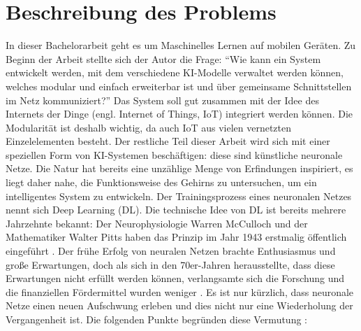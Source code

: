 \section{Beschreibung des Problems}
In dieser Bachelorarbeit geht es um Maschinelles Lernen auf mobilen Geräten.
Zu Beginn der Arbeit stellte sich der Autor die Frage:
\enquote{Wie kann ein System entwickelt werden, mit dem verschiedene KI-Modelle
  verwaltet werden können, welches modular und einfach erweiterbar ist
  und über gemeinsame Schnittstellen im Netz kommuniziert?}
Das System soll gut zusammen mit der Idee des Internets der Dinge
(engl. Internet of Things, IoT) integriert werden können.
Die Modularität ist deshalb wichtig, da auch IoT aus vielen vernetzten
Einzelelementen besteht.
Der restliche Teil dieser Arbeit wird sich mit einer
speziellen Form von KI-Systemen beschäftigen: diese sind künstliche
neuronale Netze. Die Natur hat bereits eine unzählige Menge von Erfindungen
inspiriert, es liegt daher nahe, die Funktionsweise des Gehirns zu
untersuchen, um ein intelligentes System zu entwickeln.
Der Trainingsprozess eines neuronalen Netzes nennt sich Deep Learning (DL).
Die technische Idee von DL ist bereits mehrere
Jahrzehnte bekannt:
Der Neurophysiologie Warren McCulloch und der Mathematiker Walter Pitts
haben das Prinzip im Jahr 1943 erstmalig öffentlich eingeführt
\parencite[280]{book:hands-on-ml}. Der frühe Erfolg von neuralen
Netzen brachte Enthusiasmus und große Erwartungen,
doch als sich in den 70er-Jahren herausstellte, dass diese Erwartungen nicht erfüllt
werden können, verlangsamte sich die Forschung und die finanziellen Fördermittel
wurden weniger \parencite[280]{book:hands-on-ml}.
Es ist nur kürzlich, dass neuronale Netze einen neuen Aufschwung erleben
und dies nicht nur eine Wiederholung der Vergangenheit ist.
Die folgenden Punkte begründen diese Vermutung \parencite[280]{book:hands-on-ml}:
